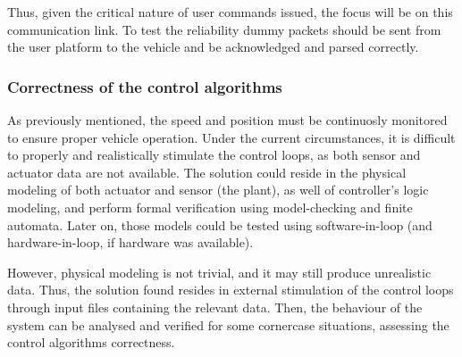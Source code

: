 Thus, given the critical nature of user commands issued, the focus will be on
this communication link. To test the reliability dummy packets should be sent
from the user platform to the vehicle and be acknowledged and parsed correctly.

\subsubsection{Correctness of the control algorithms}%
\label{sec:correct-control-algorithms-test}
As previously mentioned, the speed and position must be continuosly monitored
to ensure proper vehicle operation. Under the current circumstances, it is
difficult to properly and realistically stimulate the control loops, as both
sensor and actuator data are not available. The solution could reside in the
physical modeling of both actuator and sensor (the plant), as well of
controller's logic modeling, and perform formal verification
using model-checking and finite automata. Later on, those models could be tested
using software-in-loop (and hardware-in-loop, if hardware was available). 

However, physical modeling is not trivial, and it may still produce unrealistic
data. Thus, the solution found resides in external stimulation of the control
loops through input files containing the relevant data. Then, the behaviour of
the system can be analysed and verified for some cornercase situations,
assessing the control algorithms correctness.
%
%
%

